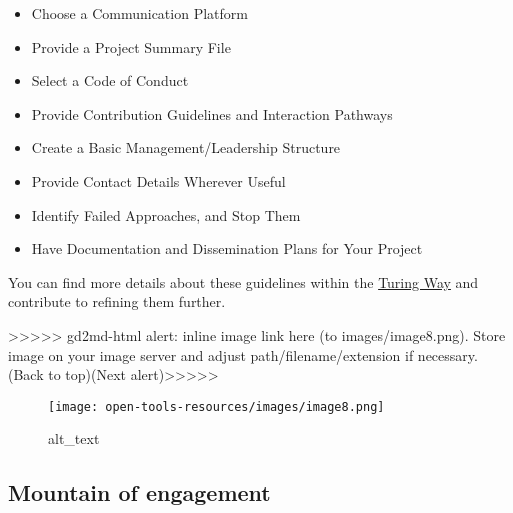 \documentclass[
  letterpaper,
  DIV=11,
  numbers=noendperiod]{scrreport}
\providecommand{\tightlist}{%
  \setlength{\itemsep}{0pt}\setlength{\parskip}{0pt}}\usepackage{longtable,booktabs,array}
\begin{document}
\begin{itemize}
\tightlist
\item
  Choose a Communication Platform
\item
  Provide a Project Summary File
\item
  Select a Code of Conduct
\item
  Provide Contribution Guidelines and Interaction Pathways
\item
  Create a Basic Management/Leadership Structure
\item
  Provide Contact Details Wherever Useful
\item
  Identify Failed Approaches, and Stop Them
\item
  Have Documentation and Dissemination Plans for Your Project
\end{itemize}

You can find more details about these guidelines within the
\href{https://the-turing-way.netlify.app/collaboration/new-community.html}{Turing
Way} and contribute to refining them further.

{\textgreater\textgreater\textgreater\textgreater\textgreater{}
gd2md-html alert: inline image link here (to images/image8.png). Store
image on your image server and adjust path/filename/extension if
necessary. }(Back to top)(Next
alert){\textgreater\textgreater\textgreater\textgreater\textgreater{} }

\begin{figure}

{\centering \texttt{[image: open-tools-resources/images/image8.png]}

}

\caption{alt\_text}

\end{figure}

\hypertarget{mountain-of-engagement}{%
\subsection{Mountain of engagement}\label{mountain-of-engagement}}
\end{document}
